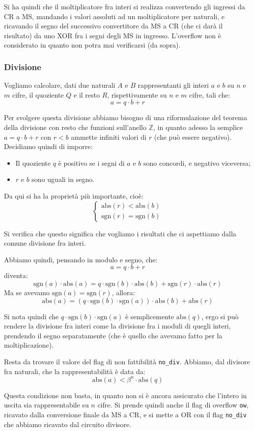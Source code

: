 \documentclass[a4paper,11pt]{article}
\begin{document}
Si ha quindi che il moltiplicatore fra interi si realizza convertendo gli ingressi da CR a MS, mandando i valori assoluti ad un moltiplicatore per naturali, e ricavando il segno del successivo convertitore da MS a CR (che ci darà il risultato) da uno XOR fra i segni degli MS in ingresso.
L'overflow non è considerato in quanto non potra mai verificarsi (da sopra).

\subsubsection{Divisione}
Vogliamo calcolare, dati due naturali $A$ e $B$ rappresentanti gli interi $a$ e $b$ su $n$ e $m$ cifre, il quoziente $Q$ e il resto $R$, rispettivamente su $n$ e $m$ cifre, tali che:
$$
a = q \cdot b + r
$$

Per svolgere questa divisione abbiamo bisogno di una riformulazione del teorema della divisione con resto che funzioni sull'anello $\mathbb{Z}$, in quanto adesso la semplice $a = q \cdot b + r$ con $r < b$ ammette infiniti valori di $r$ (che può essere negativo).
Decidiamo quindi di imporre:
\begin{itemize}
	\item Il quoziente $q$ è positivo se i segni di $a$ e $b$ sono concordi, e negativo viceversa;
	\item $r$ e $b$ sono uguali in segno.
\end{itemize}

Da qui si ha la proprietà più importante, cioè:
\[
	\begin{cases}
		\mathrm{abs}(r) < \mathrm{abs}(b) \\ 
		\mathrm{sgn}(r) = \mathrm{sgn}(b)
	\end{cases}
\]

Si verifica che questo significa che vogliamo i risultati che ci aspettiamo dalla comune divisione fra interi.

Abbiamo quindi, pensando in modulo e segno, che:
$$
a = q \cdot b + r 
$$
diventa:
$$
\mathrm{sgn}(a) \cdot \mathrm{abs}(a) = q \cdot \mathrm{sgn}(b) \cdot \mathrm{abs}(b) + \mathrm{sgn}(r) \cdot \mathrm{abs}(r)
$$
Ma se avevamo $\mathrm{sgn}(a) = \mathrm{sgn}(r)$, allora:
$$
\mathrm{abs}(a) = \left( q \cdot \mathrm{sgn}(b) \cdot \mathrm{sgn}(a) \right) \cdot \mathrm{abs}(b) + \mathrm{abs}(r)
$$

Si nota quindi che $ q \cdot \mathrm{sgn}(b) \cdot \mathrm{sgn}(a) $ è semplicemente $\mathrm{abs}(q)$, ergo si può rendere la divisione fra interi come la divisione fra i moduli di quegli interi, prendendo il segno separatamente (che è quello che avevamo fatto per la moltiplicazione).

Resta da trovare il valore del flag di non fattibilità \lstinline|no_div|.
Abbiamo, dal divisore fra naturali, che la rappresentabilità è data da:
$$
\mathrm{abs}(a) < \beta^n \cdot \mathrm{abs}(q)
$$

Questa condizione non basta, in quanto non si è ancora assicurato che l'intero in uscita sia rappresentabile su $n$ cifre.
Si prende quindi anche il flag di overflow \lstinline|ow|, ricavato dalla conversione finale da MS a CR, e si mette a OR con il flag \lstinline|no_div| che abbiamo ricavato dal circuito divisore.
\end{document}
